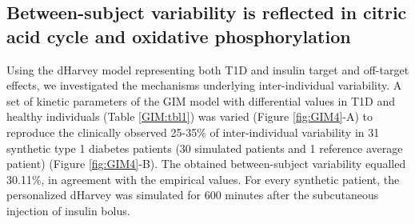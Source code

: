 \subsection{Between-subject variability is reflected in citric acid cycle and oxidative phosphorylation}
Using the dHarvey model representing both T1D and insulin target and off-target effects, we investigated the mechanisms underlying inter-individual variability. A set of kinetic parameters of the GIM model with differential values in T1D and healthy individuals (Table \ref{GIM:tbl1}) \cite{schaller2013generic} was varied (Figure \ref{fig:GIM4}-A) to reproduce the clinically observed 25-35\% \cite{heinemann2002variability} of inter-individual variability in 31 synthetic type 1 diabetes patients (30 simulated patients and 1 reference average patient) (Figure \ref{fig:GIM4}-B). The obtained between-subject variability equalled 30.11\%, in agreement with the empirical values. For every synthetic patient, the personalized dHarvey was simulated for 600 minutes after the subcutaneous injection of insulin bolus.\\
